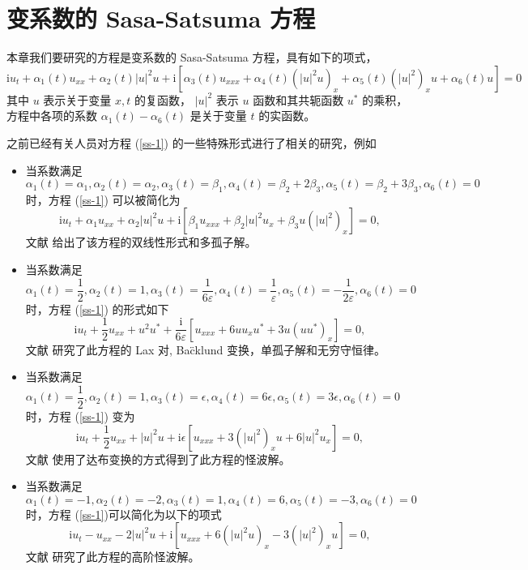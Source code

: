 \chapter{变系数的 Sasa-Satsuma 方程}
本章我们要研究的方程是变系数的 Sasa-Satsuma 方程，具有如下的项式，
\begin{equation}
  \mathrm{i}u_{t} + \alpha_{1}(t)u_{xx} + \alpha_2(t)|u|^{2}u + \mathrm{i}\left[\alpha_3(t)u_{xxx} + \alpha_{4}(t)(|u|^{2}u)_{x} + \alpha_{5}(t)(|u|^{2})_{x}u + \alpha_{6}(t)u \right] = 0  \label{ss-1}
\end{equation}
其中 $u$ 表示关于变量 $x, t$ 的复函数， $|u|^2$ 表示 $u$ 函数和其共轭函数 $u^*$ 的乘积，方程中各项的系数 $\alpha_1(t) - \alpha_6(t)$ 是关于变量 $t$ 的实函数。

之前已经有关人员对方程 (\ref{ss-1}) 的一些特殊形式进行了相关的研究，例如
\begin{itemize}
  \item 当系数满足 $\alpha_1(t)=\alpha_1, \alpha_2(t)=\alpha_2, \alpha_3(t)=\beta_1, \alpha_4(t)=\beta_2+2\beta_3, \alpha_5(t)=\beta_2+3\beta_3, \alpha_6(t) = 0$ 时，方程 (\ref{ss-1}) 可以被简化为
      \begin{equation}
        \mathrm{i}u_t + \alpha_1 u_{xx} + \alpha_2 |u|^2u + \mathrm{i}\left[\beta_1u_{xxx} + \beta_2|u|^2u_x + \beta_3u(|u|^2)_x\right] = 0,
      \end{equation}
      文献 \cite{ss-46} 给出了该方程的双线性形式和多孤子解。
  \item 当系数满足 $\alpha_1(t)=\dfrac{1}{2}, \alpha_2(t)=1, \alpha_3(t)=\dfrac{1}{6\varepsilon}, \alpha_4(t)=\dfrac{1}{\varepsilon}, \alpha_5(t)=-\dfrac{1}{2\varepsilon}, \alpha_6(t) = 0$ 时，方程 (\ref{ss-1}) 的形式如下
      \begin{equation}
        \mathrm{i}u_t + \frac{1}{2}u_{xx} + u^2u^* + \frac{\mathrm{i}}{6\varepsilon}\left[u_{xxx} + 6uu_xu^* + 3u(uu^*)_x\right] = 0,
      \end{equation}
      文献 \cite{ss-45} 研究了此方程的 Lax 对, Ba\"cklund 变换，单孤子解和无穷守恒律。
  \item 当系数满足 $\alpha_1(t)=\dfrac{1}{2}, \alpha_2(t)=1, \alpha_3(t)=\epsilon, \alpha_4(t)=6\epsilon, \alpha_5(t)=3\epsilon, \alpha_6(t) = 0$ 时，方程 (\ref{ss-1}) 变为
      \begin{equation}
        \mathrm{i}u_t + \frac{1}{2}u_{xx} + |u|^2u + \mathrm{i}\epsilon\left[u_{xxx} + 3(|u|^2)_xu + 6|u|^2u_x \right] = 0,
      \end{equation}
      文献 \cite{ss-40} 使用了达布变换的方式得到了此方程的怪波解。
  \item 当系数满足 $\alpha_1(t)=-1, \alpha_2(t)=-2, \alpha_3(t)=1, \alpha_4(t)=6, \alpha_5(t)=-3, \alpha_6(t) = 0$ 时，方程 (\ref{ss-1})可以简化为以下的项式
      \begin{equation}
        \mathrm{i}u_t - u_{xx} - 2|u|^2u + \mathrm{i}\left[u_{xxx} + 6(|u|^2u)_x - 3(|u|^2)_xu \right] = 0,
      \end{equation}
      文献 \cite{ss-39} 研究了此方程的高阶怪波解。
\end{itemize}
